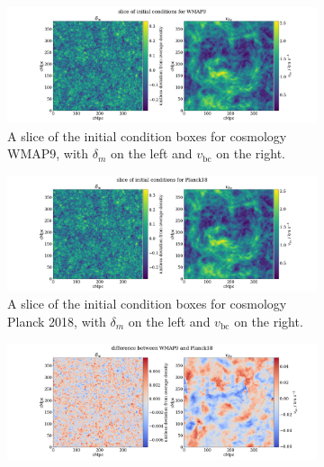 \documentclass[floats,floatfix,showpacs,amssymb,prd,superscriptaddress,nofootinbib]{revtex4-2} %
\begin{document}
\begin{figure}[H]
     \centering
     \begin{subfigure}[b]{0.9\textwidth}
         \centering
         \includegraphics[width=\textwidth]{images/ic_grids/initial_condition_grid_WMAP9.png}
         \caption{A slice of the initial condition boxes for cosmology WMAP9, with $\delta_m$ on the left and $v_{\text{bc}}$ on the right.}
         \label{fig:IC_WMAP9}
     \end{subfigure}
     \hfill
     \begin{subfigure}[b]{0.9\textwidth}
         \centering
         \includegraphics[width=\textwidth]{images/ic_grids/initial_condition_grid_Planck18.png}
         \caption{A slice of the initial condition boxes for cosmology Planck 2018, with $\delta_m$ on the left and $v_{\text{bc}}$ on the right.}
         \label{fig:IC_Planck18}
     \end{subfigure}
     \hfill
     \begin{subfigure}[b]{0.9\textwidth}
         \centering
         \includegraphics[width=\textwidth]{images/ic_grids/difference_in_initial_grid_WMAP9_Planck18.png}

\end{subfigure}
\end{figure}
\end{document}
